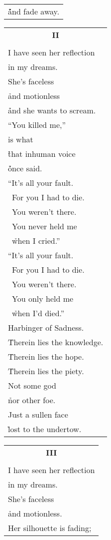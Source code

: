 \documentclass{article}
\begin{document}
\begin{center}
\begin{tabular}{l}
\h\h\h\h\h and fade away. \\
\end{tabular}
\begin{tabular}{l}
\multicolumn{1}{c}{\large\textbf{II}} \\
\\
I have seen her reflection \\
\h in my dreams. \\
She's faceless \\
\h and motionless \\
\h\h and she wants to scream. \\ %
``You killed me,'' \\
\h is what \\
\h\h that inhuman voice \\
\h\h\h once said. \\
``It's all your fault. \\
\ For you I had to die. \\
\ You weren't there. \\
\ You never held me \\
\ \h when I cried.'' \\
``It's all your fault. \\
\ For you I had to die. \\
\ You weren't there. \\
\ You only held me \\
\ \h when I'd died.'' \\
Harbinger of Sadness. \\
\h Therein lies the knowledge. \\
\h Therein lies the hope. \\
\h Therein lies the piety. \\
Not some god \\
\h nor other foe. \\ %
Just a sullen face \\
\h lost to the undertow. \\
\end{tabular}
\begin{tabular}{l}
\multicolumn{1}{c}{\large\textbf{III}} \\
\\
I have seen her reflection \\
\h in my dreams. \\
She's faceless \\
\h and motionless. \\
Her silhouette is fading; \\

\end{tabular}
\end{center}
\end{document}
